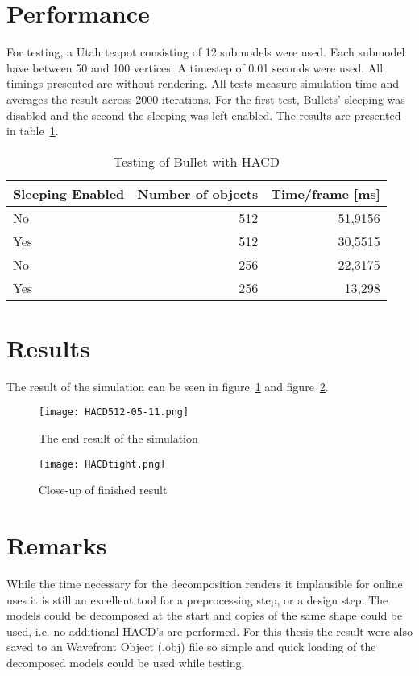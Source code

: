 \section{Performance}
For testing, a Utah teapot consisting of 12 submodels were used. Each submodel have
between 50 and 100 vertices. A timestep of 0.01 seconds were used. All timings
presented are without rendering. All tests measure simulation
time and averages the result across 2000 iterations. For the first test, Bullets' sleeping was
disabled and the second the sleeping was left enabled. The results are presented
in table~\ref{tab:hacdtest}.

\begin{table}[htbp]
\caption{Testing of Bullet with HACD}
\begin{center}
\begin{tabular}{|l|r|r|}
\hline
\textbf{Sleeping Enabled} & \multicolumn{1}{l|}{\textbf{Number of objects}} & \multicolumn{1}{l|}{\textbf{Time/frame [ms]}} \\ \hline
No & 512 & 51,9156 \\ \hline
Yes  & 512 & 30,5515 \\ \hline
No & 256 & 22,3175 \\ \hline
Yes  & 256 & 13,298 \\ \hline
\end{tabular}
\end{center}
\label{tab:hacdtest}
\end{table}

\section{Results}
The result of the simulation can be seen in figure~\ref{fig:hacd0.0} and figure~\ref{fig:tight}.
\begin{figure}[H]
  \centering
  \texttt{[image: HACD512-05-11.png]}
  \caption{The end result of the simulation}
  \label{fig:hacd0.0}
\end{figure}

\begin{figure}[H]
  \centering
  \texttt{[image: HACDtight.png]}
  \caption{Close-up of finished result}
  \label{fig:tight}
\end{figure}

\section{Remarks}
While the time necessary for the decomposition renders it implausible for online uses
it is still an excellent tool for a preprocessing step, or a design step.
The models could be
decomposed at the start and copies of the same shape could be used, i.e. no additional
HACD's are performed. For this thesis the result were also saved to an Wavefront Object (.obj) file so simple and quick
 loading of the decomposed models could be used while testing.


